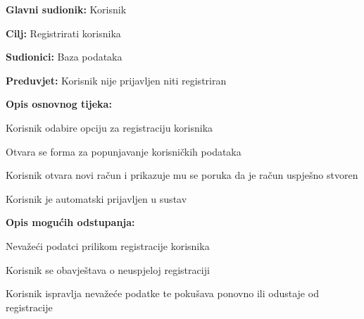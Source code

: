 \begin{packed_item}
\begin{packed_item}
\begin{packed_enum}
		\end{packed_enum}

	\end{packed_item}
\end{packed_item}

\pagebreak

\noindent {}
\begin{packed_item}

	\item \textbf{Glavni sudionik:} Korisnik
	\item \textbf{Cilj:} Registrirati korisnika
	\item \textbf{Sudionici:} Baza podataka
	\item \textbf{Preduvjet:} Korisnik nije prijavljen niti registriran
	\item \textbf{Opis osnovnog tijeka:}
	
	\item[] \begin{packed_enum}
		
		\item Korisnik odabire opciju za registraciju korisnika
		\item Otvara se forma za popunjavanje korisničkih podataka
		\item Korisnik otvara novi račun i prikazuje mu se poruka da je račun uspješno stvoren
		\item Korisnik je automatski prijavljen u sustav

	\end{packed_enum}

	\item  \textbf{Opis mogućih odstupanja:}
	
	\item[] \begin{packed_item}
	
		\item[3.a] Nevažeći podatci prilikom registracije korisnika
		\item[] \begin{packed_enum}
			
			\item Korisnik se obavještava o neuspjeloj registraciji
			\item Korisnik ispravlja nevažeće podatke te pokušava ponovno ili odustaje od registracije
			
		\end{packed_enum}
		
	\end{packed_item}
\end{packed_item}

